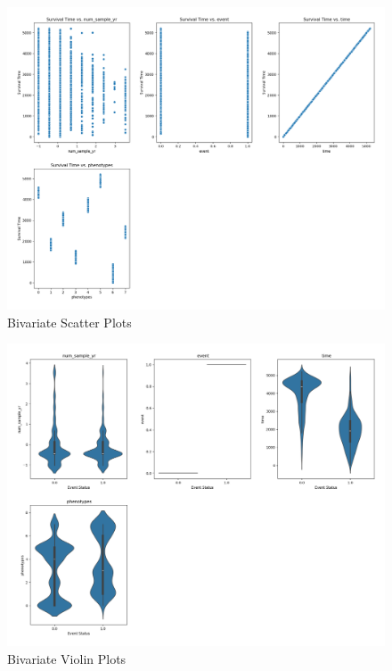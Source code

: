 \begin{figure}[h]
    \centering
    \includegraphics[scale=0.3]{Figures/EDA/scatter4.png}
    \caption{Bivariate Scatter Plots}
    \label{fig:scatter2}
\end{figure}

\begin{figure}[h]
    \centering
    \includegraphics[scale=0.3]{Figures/EDA/violin4.png}
    \caption{Bivariate Violin Plots}
    \label{fig:your_label}
\end{figure}

